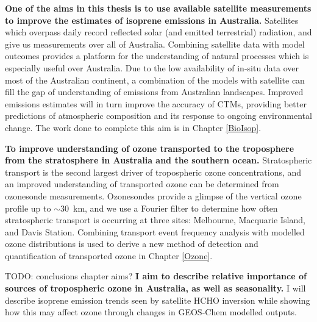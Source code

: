   \textbf{One of the aims in this thesis is to use available satellite measurements to improve the estimates of isoprene emissions in Australia.}
  Satellites which overpass daily record reflected solar (and emitted terrestrial) radiation, and give us measurements over all of Australia.
  Combining satellite data with model outcomes provides a platform for the understanding of natural processes which is especially useful over Australia.
  Due to the low availability of in-situ data over most of the Australian continent, a combination of the models with satellite can fill the gap of understanding of emissions from Australian landscapes.
  Improved emissions estimates will in turn improve the accuracy of CTMs, providing better predictions of atmospheric composition and its response to ongoing environmental change.
  The work done to complete this aim is in Chapter \ref{BioIsop}.
  
  \textbf{To improve understanding of ozone transported to the troposphere from the stratosphere in Australia and the southern ocean.}
  Stratospheric transport is the second largest driver of tropospheric ozone concentrations, and an improved understanding of transported ozone can be determined from ozonesonde measurements.
  Ozonesondes provide a glimpse of the vertical ozone profile up to $\sim 30$~km, and we use a Fourier filter to determine how often stratospheric transport is occurring at three sites: Melbourne, Macquarie Island, and Davis Station. 
  Combining transport event frequency analysis with modelled ozone distributions is used to derive a new method of detection and quantification of transported ozone in Chapter \ref{Ozone}.
  
  
  TODO: conclusions chapter aims? 
  \textbf{I aim to describe relative importance of sources of tropospheric ozone in Australia, as well as seasonality.}
  I will describe isoprene emission trends seen by satellite HCHO inversion while showing how this may affect ozone through changes in GEOS-Chem modelled outputs.
  

